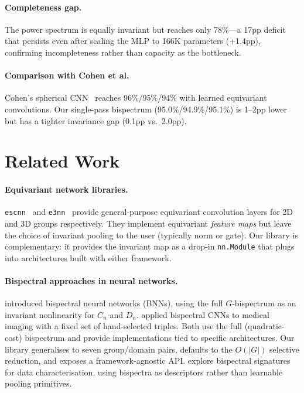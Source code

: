 \documentclass{article}
\theoremstyle{definition}
\theoremstyle{remark}
\theoremstyle{definition}
\begin{document}
\paragraph{Completeness gap.}
The power spectrum is equally invariant but reaches only 78\%---a 17pp
deficit that persists even after scaling the MLP to 166K parameters
(+1.4pp), confirming incompleteness rather than capacity as the
bottleneck.

\paragraph{Comparison with Cohen et al.}
Cohen's spherical CNN~\citep{cohen2018spherical} reaches 96\%/95\%/94\%
with learned equivariant convolutions. Our single-pass bispectrum
(95.0\%/94.9\%/95.1\%) is 1--2pp lower but has a tighter invariance gap
(0.1pp vs.\ 2.0pp).


\section{Related Work}
\label{sec:related}

\paragraph{Equivariant network libraries.}
\texttt{escnn}~\citep{cesa2022program} and \texttt{e3nn}~\citep{geiger2022e3nn}
provide general-purpose equivariant convolution layers for 2D and 3D
groups respectively. They implement equivariant \emph{feature maps} but
leave the choice of invariant pooling to the user (typically norm or
gate). Our library is complementary: it provides the invariant map as a
drop-in \texttt{nn.Module} that plugs into architectures built with either
framework.

\paragraph{Bispectral approaches in neural networks.}
\citet{sanborn2023bispectral} introduced bispectral neural networks (BNNs),
using the full $G$-bispectrum as an invariant nonlinearity for $C_n$ and $D_n$.
\citet{oreiller2022bispectral} applied bispectral CNNs to medical imaging
with a fixed set of hand-selected triples. Both use the full (quadratic-cost)
bispectrum and provide implementations tied to specific architectures.
Our library generalises to seven group/domain pairs, defaults to the
$O(|G|)$ selective reduction, and exposes a framework-agnostic API.
\citet{chevalley2024bispectral} explore bispectral signatures for data
characterisation, using bispectra as descriptors rather than learnable
pooling primitives.
\end{document}
